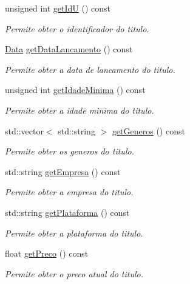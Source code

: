 \begin{DoxyCompactItemize}
unsigned int \mbox{\hyperlink{class_titulo_af8fed6503c1c528ac3bfdbb182fce0b6}{get\+IdU}} () const
\begin{DoxyCompactList}\small\item\em Permite obter o identificador do titulo. \end{DoxyCompactList}\item 
\mbox{\hyperlink{class_data}{Data}} \mbox{\hyperlink{class_titulo_a1cb9b8c0a9dca73d5925922ccc041fa8}{get\+Data\+Lancamento}} () const
\begin{DoxyCompactList}\small\item\em Permite obter a data de lancamento do titulo. \end{DoxyCompactList}\item 
unsigned int \mbox{\hyperlink{class_titulo_a8048db7604abd58892122c810a6794be}{get\+Idade\+Minima}} () const
\begin{DoxyCompactList}\small\item\em Permite obter a idade minima do titulo. \end{DoxyCompactList}\item 
std\+::vector$<$ std\+::string $>$ \mbox{\hyperlink{class_titulo_a09992b973f8cfe755f21ff725b2970f0}{get\+Generos}} () const
\begin{DoxyCompactList}\small\item\em Permite obter os generos do titulo. \end{DoxyCompactList}\item 
std\+::string \mbox{\hyperlink{class_titulo_a48d810fe27da41cfb726fb5680a68471}{get\+Empresa}} () const
\begin{DoxyCompactList}\small\item\em Permite obter a empresa do titulo. \end{DoxyCompactList}\item 
std\+::string \mbox{\hyperlink{class_titulo_a2a57a31d40c5df012b3c6e2451c253dd}{get\+Plataforma}} () const
\begin{DoxyCompactList}\small\item\em Permite obter a plataforma do titulo. \end{DoxyCompactList}\item 
float \mbox{\hyperlink{class_titulo_a93725bdc2e98350e47b54fd76c0fa236}{get\+Preco}} () const
\begin{DoxyCompactList}\small\item\em Permite obter o preco atual do titulo. \end{DoxyCompactList}\item 

\end{DoxyCompactItemize}
